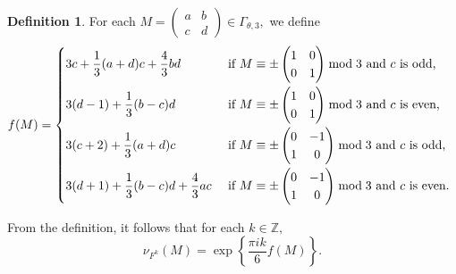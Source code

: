 \documentclass[12pt]{article}
\theoremstyle{definition}
\newtheorem{definition}[theorem]{Definition}
\numberwithin{equation}{section}
\numberwithin{theorem}{section}
\begin{document}
\begin{definition}
For each 
$
M=
\begin{pmatrix}
a & b \\
c & d
\end{pmatrix}
\in 
\Gamma_{\theta,3},
$ 
we define 
\begin{equation*}
f(M)
=
\begin{cases}
\displaystyle
3c+\frac13(a+d)c+\frac43bd
&
\text
{ 
if
$
M
\equiv 
\pm
\begin{pmatrix}
1 & 0 \\
0 & 1
\end{pmatrix} 
\bmod{3}
$ 
and 
$c$ is odd,
} \vspace{1mm} \\
\displaystyle
3(d-1)+\frac13(b-c)d
&
\text
{ 
if
$
M
\equiv 
\pm
\begin{pmatrix}
1 & 0 \\
0 & 1
\end{pmatrix}
\bmod{3}
$ 
and 
$c$ is even,
}  \vspace{1mm} \\
\displaystyle
3(c+2)+\frac13(a+d)c
&
\text
{ 
if
$
M
\equiv 
\pm
\begin{pmatrix}
0 & -1 \\
1 & 0
\end{pmatrix}
\bmod{3}
$ 
and 
$c$ is odd,
}  \vspace{1mm} \\
\displaystyle
3(d+1)+\frac13(b-c)d+\frac43ac
&
\text
{ 
if
$
M
\equiv 
\pm
\begin{pmatrix}
0 & -1 \\
1 & 0
\end{pmatrix} 
\bmod{3}
$ 
and 
$c$ is even.
} 
\end{cases}
\end{equation*}
\end{definition}


From the definition, 
it follows that for each $k\in\mathbb{Z},$ 
\begin{equation*}
\nu_{F^k}(M)=
\exp \left\{
\frac{\pi i k}{6}
f(M)
\right\}. 
\end{equation*}
\end{document}
